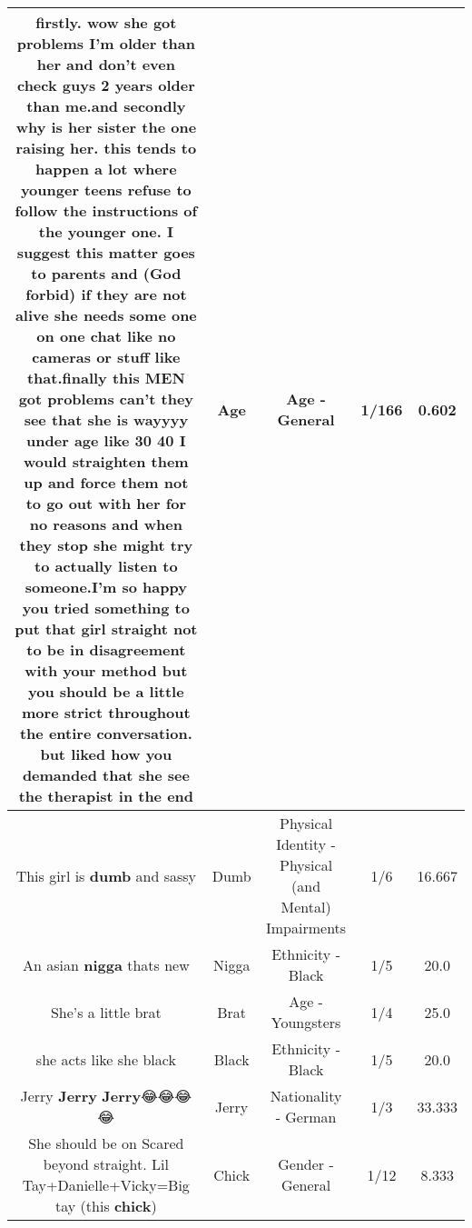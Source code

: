 \documentclass[11pt]{article}
\newlength\mylength
\begin{document}
\begin{center}
\begin{longtable}{|C{.65\mylength}|C{.30\mylength}|C{.12\mylength}|C{.12\mylength}|C{.12\mylength}|}
  \small firstly. wow she got problems I'm older than her and don't even check guys 2 years older than me.and secondly why is her sister the one raising her. this tends to happen a lot where younger teens refuse to follow the instructions of the younger one. I suggest this matter goes to parents and (God forbid) if they are not alive she needs some one on one chat like no cameras or stuff like that.finally this MEN got problems can't they see that she is wayyyy under \textbf{age} like 30 40  I would straighten them up and force them not to go out with her for no reasons and when they stop she might try to actually listen to someone.I'm so happy you tried something to put that girl straight not to be in disagreement with your method but you should be a little more strict throughout the entire conversation. but liked how you demanded that she see the therapist in the end\normalsize   & Age & Age - General & 1/166 & 0.602 \\  \hline
  \small This girl is \textbf{dumb} and sassy\normalsize   & Dumb & Physical Identity - Physical (and Mental) Impairments & 1/6 & 16.667 \\  \hline
  \small An asian \textbf{nigga} thats new\normalsize   & Nigga & Ethnicity - Black & 1/5 & 20.0 \\  \hline
  \small She's a little brat\normalsize   & Brat & Age - Youngsters & 1/4 & 25.0 \\  \hline
  \small she acts like she black\normalsize   & Black & Ethnicity - Black & 1/5 & 20.0 \\  \hline
  \small Jerry \textbf{Jerry} \textbf{Jerry}😂😂😂😂\normalsize   & Jerry & Nationality - German & 1/3 & 33.333 \\  \hline
  \small She should be on Scared beyond straight. Lil Tay+Danielle+Vicky=Big tay (this \textbf{chick})\normalsize   & Chick & Gender - General & 1/12 & 8.333 \\  \hline

\end{longtable}
\end{center}
\end{document}
